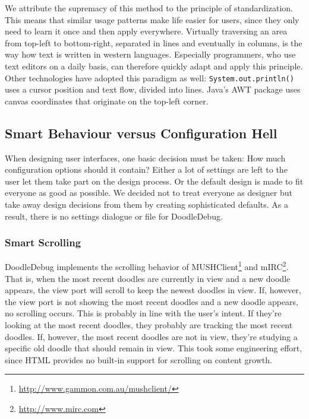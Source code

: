 \documentclass[english]{acm_proc_article-sp}
\newcommand\nes[1]{\nbc{nes}{#1}{blue}}
\begin{document}
We attribute the supremacy of this method to the principle of standardization\cite[pp. 200--203]{Norm88a}. This means that similar usage patterns make life easier for users, since they only need to learn it once and then apply everywhere. Virtually traversing an area from top-left to bottom-right, separated in lines and eventually in columns, is the way how text is written in western languages. Especially programmers, who use text editors on a daily basis, can therefore quickly adapt and apply this principle. Other technologies have adopted this paradigm as well: \verb-System.out.println()- uses a cursor position and text flow, divided into lines. Java's AWT package uses canvas coordinates that originate on the top-left corner.

\subsection{Smart Behaviour versus Configuration Hell}
When designing user interfaces, one basic decision must be taken: How much configuration options should it contain? Either a lot of settings are left to the user let them take part on the design process. Or the default design is made to fit everyone as good as possible. We decided not to treat everyone as designer
\cite[pp95ff]{Buxt07a}
\cite[p155]{Norm88a}
but take away design decisions from them by creating sophisticated defaults.
As a result, there is no settings dialogue or file for DoodleDebug. \nes{Nice!}
\subsubsection{Smart Scrolling}
DoodleDebug implements the scrolling behavior of MUSHClient\footnote{\url{http://www.gammon.com.au/mushclient/}} and mIRC\footnote{\url{http://www.mirc.com}}. That is, when the most recent doodles are currently in view and a new doodle appears, the view port will scroll to keep the newest doodles in view. If, however, the view port is not showing the most recent doodles and a new doodle appears, no scrolling occurs. 
This is probably in line with the user's intent. If they're looking at the most recent doodles, they probably are tracking the most recent doodles. If, however, the most recent doodles are not in view, they're studying a specific old doodle that should remain in view. 
This took some engineering effort, since HTML provides no built-in support for scrolling on content growth.
\end{document}
